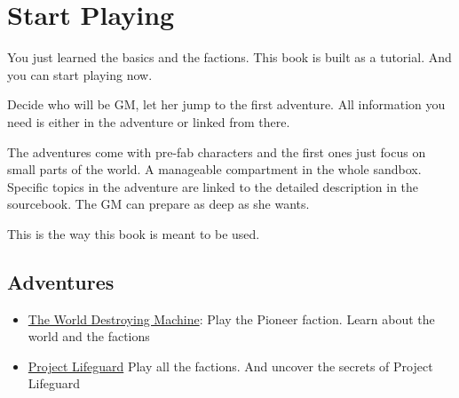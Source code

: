 \chapter{Start Playing}

You just learned the basics and the factions. This book is built as a tutorial. And you can start playing now.

Decide who will be GM, let her jump to the first adventure. All information you need is either in the adventure or linked from there.

The adventures come with pre-fab characters and the first ones just focus on small parts of the world. A manageable compartment in the whole sandbox.
Specific topics in the adventure are linked to the detailed description in the sourcebook. The GM can prepare as deep as she wants.

This is the way this book is meant to be used.

\section{Adventures}

\begin{itemize}
\item \hyperref[ch:the world destroying machine]{The World Destroying Machine}: Play the Pioneer faction. Learn about the world and the factions
\item \hyperref[ch:project lifeguard]{Project Lifeguard} Play all the factions. And uncover the secrets of Project Lifeguard
\end{itemize}
